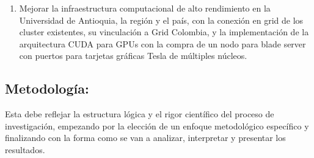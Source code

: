 \begin{enumerate}
\item Mejorar la infraestructura computacional de alto rendimiento en
  la Universidad de Antioquia, la región y el país, con la conexión en
  grid de los cluster existentes, su vinculación a Grid Colombia, y la
  implementación de la arquitectura CUDA para GPUs con la compra de un
  nodo para blade server con puertos para tarjetas gráficas Tesla de
  múltiples núcleos.
\label{item:grid}
\end{enumerate}

\subsection{Metodología:                                   }
\begin{instrucciones}
  Esta debe reflejar la estructura lógica y el rigor científico del
  proceso de investigación, empezando por la elección de un enfoque
  metodológico específico y finalizando con la forma como se van a
  analizar, interpretar y presentar los resultados.
\end{instrucciones}

